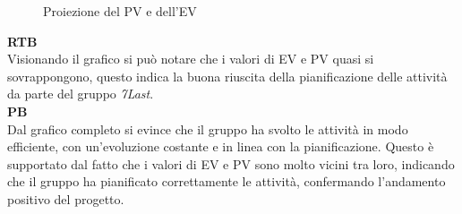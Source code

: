 \begin{figure*}[!h]
    \caption{Proiezione del PV e dell'EV}
\end{figure*}

\begin{flushleft}
    \textbf{RTB} \\
    Visionando il grafico si può notare che i valori di EV e PV quasi si sovrappongono, questo indica la buona riuscita della pianificazione delle attività da parte del gruppo \textit{7Last}. \\

    \textbf{PB} \\
    Dal grafico completo si evince che il gruppo ha svolto le attività in modo efficiente, con un'evoluzione costante e in linea con la pianificazione. Questo è supportato dal fatto che i valori di EV e PV sono molto vicini tra loro, indicando che il gruppo ha pianificato correttamente le attività, confermando l'andamento positivo del progetto.
\end{flushleft}
    
\newpage

